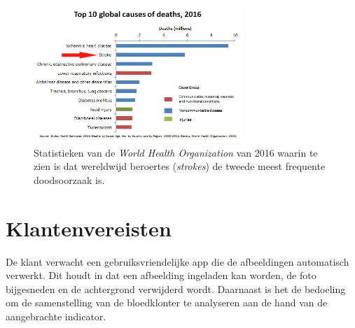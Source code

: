 \documentclass[a4paper,kulak]{kulakarticle}
\begin{document}
	\begin{figure}[H]
		\centering
		\includegraphics[width = 0.7\textwidth]{top10doodsoorzaken.png}
	
		\caption{Statistieken van de \textit{World Health Organization} van 2016 waarin te zien is dat wereldwijd beroertes (\textit{strokes}) de tweede meest frequente doodsoorzaak is.}
		\label{figuur doodsoorzaken}
	\end{figure}

\pagebreak
\newpage

\tableofcontents

\newpage

\section{Klantenvereisten}
De klant verwacht een gebruiksvriendelijke app die de afbeeldingen automatisch verwerkt. Dit houdt in dat een afbeelding ingeladen kan worden, de foto bijgesneden en de achtergrond verwijderd wordt. Daarnaast is het de bedoeling om de samenstelling van de bloedklonter te analyseren aan de hand van de aangebrachte indicator.
\end{document}
